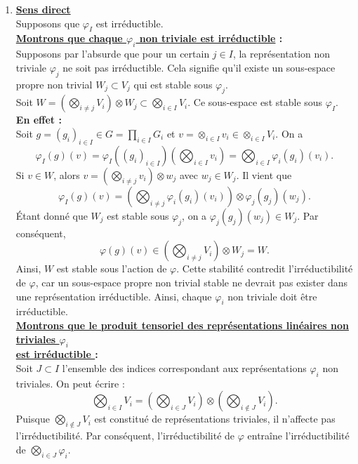 \documentclass[a4paper, 14pt]{report}
\begin{document}
\begin{onehalfspace}
{\begin{enumerate} [label=\roman*)]
				\item  \textbf{\underline{Sens direct}}\\
				Supposons que \( \varphi_I \) est irréductible.\\ 		
				\textbf{\underline{Montrons que chaque \( \varphi_i \) non triviale est irréductible} :}\\
				Supposons par l'absurde que pour un certain \( j \in I \), la représentation non triviale \( \varphi_j \) ne soit pas irréductible.  Cela signifie qu'il existe un sous-espace propre non trivial \( W_j \subset V_j \) qui est stable sous \( \varphi_j \).\\
				Soit
				\(
				W = \left( \bigotimes_{i \neq j} V_i \right) \otimes W_j \subset \bigotimes_{i \in I} V_i.
				\)
				Ce sous-espace est stable sous \( \varphi_I \).\\
				\textbf{En effet :}\\
				Soit \( g = (g_i)_{i \in I} \in G = \prod_{i \in I} G_i \) et \( v=\otimes_{i \in I} v_i \in \otimes_{i \in I} V_i\). On a
				\[
				\varphi_I(g)(v) = \varphi_I((g_i)_{i \in I})\left( \bigotimes_{i \in I} v_i \right) = \bigotimes_{i \in I} \varphi_i(g_i)(v_i).
				\]
				Si \( v \in W \), alors \( v = \left( \bigotimes_{i \neq j} v_i \right) \otimes w_j \) avec \( w_j \in W_j \). Il vient que
				\[
				\varphi_I(g)(v) = \left( \bigotimes_{i \neq j} \varphi_i(g_i)(v_i) \right) \otimes \varphi_j(g_j)(w_j).
				\]
				Étant donné que \( W_j \) est stable sous \( \varphi_j \), on a \( \varphi_j(g_j)(w_j) \in W_j \). Par conséquent,	
				\[
				\varphi(g)(v) \in \left( \bigotimes_{i \neq j} V_i \right) \otimes W_j = W.
				\]
				Ainsi, \( W \) est stable sous l'action de \( \varphi \). Cette stabilité contredit l'irréductibilité de \( \varphi \), car un sous-espace propre non trivial stable ne devrait pas exister dans une représentation irréductible.
				Ainsi, chaque \( \varphi_i \) non triviale doit être irréductible.\\
				
				\textbf{\underline{Montrons que le produit tensoriel des représentations linéaires non triviales  \( \varphi_i \)  }}\\
				\textbf{\underline{ est irréductible } :}\\			 
				Soit \( J \subset I \) l'ensemble des indices correspondant aux représentations \( \varphi_i \) non triviales.  
				On peut écrire :
				\[
				\bigotimes_{i \in I} V_i = \left( \bigotimes_{i \in J} V_i \right) \otimes \left( \bigotimes_{i \notin J} V_i \right).
				\]
				Puisque \( \bigotimes_{i \notin J} V_i \) est constitué de représentations triviales, il n’affecte pas l'irréductibilité. Par conséquent, l'irréductibilité de \( \varphi \) entraîne l'irréductibilité de \( \bigotimes_{i \in J} \varphi_i \).\\
				

\end{enumerate}}
\end{onehalfspace}
\end{document}
